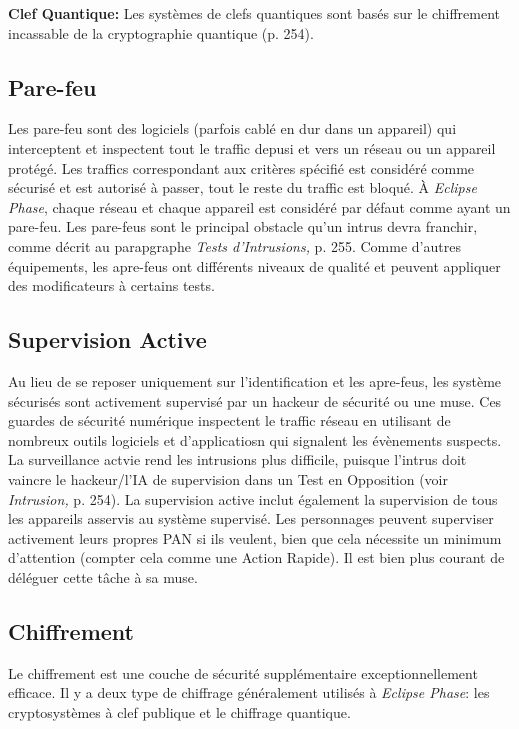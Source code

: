\textbf{Clef Quantique:} Les systèmes de clefs quantiques sont basés sur le chiffrement incassable de la cryptographie quantique (p. 254). 

\subsection{Pare-feu} 

Les pare-feu sont des logiciels (parfois cablé en dur dans un appareil) qui interceptent et inspectent tout le traffic depusi et vers un réseau ou un appareil protégé. Les traffics correspondant aux critères spécifié est considéré comme sécurisé et est autorisé à passer, tout le reste du traffic est bloqué. À \textit{Eclipse Phase}, chaque réseau et chaque appareil est considéré par défaut comme ayant un pare-feu. Les pare-feus sont le principal obstacle qu'un intrus devra franchir, comme décrit au parapgraphe \textit{Tests d'Intrusions,} p. 255. Comme d'autres équipements, les apre-feus ont différents niveaux de qualité et peuvent appliquer des modificateurs à certains tests. 

\subsection{Supervision Active} 

Au lieu de se reposer uniquement sur l'identification et les apre-feus, les système sécurisés sont activement supervisé par un hackeur de sécurité ou une muse. Ces guardes de sécurité numérique inspectent le traffic réseau en utilisant de nombreux outils logiciels et d'applicatiosn qui signalent les évènements suspects. La surveillance actvie rend les intrusions plus difficile, puisque l'intrus doit vaincre le hackeur/l'IA de supervision dans un Test en Opposition (voir \textit{Intrusion,} p. 254). La supervision active inclut également la supervision de tous les appareils asservis au système supervisé. Les personnages peuvent superviser activement leurs propres PAN si ils veulent, bien que cela nécessite un minimum d'attention (compter cela comme une Action Rapide). Il est bien plus courant de déléguer cette tâche à sa muse. 

\subsection{Chiffrement} 

Le chiffrement est une couche de sécurité supplémentaire exceptionnellement efficace. Il y a deux type de chiffrage généralement utilisés à \textit{Eclipse Phase}: les cryptosystèmes à clef publique et le chiffrage quantique. 

